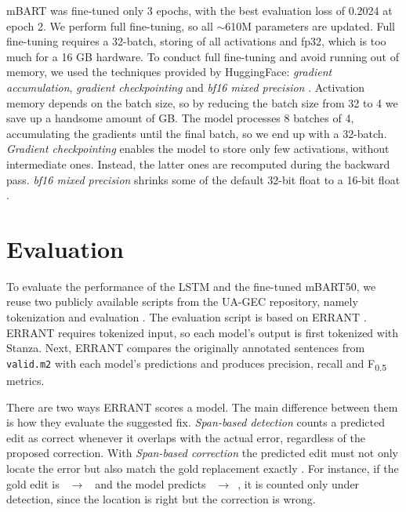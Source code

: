 \documentclass[11pt]{article}
\begin{document}
mBART was fine-tuned only 3 epochs, with the best evaluation loss of 0.2024 at epoch 2. We perform full fine-tuning, so all $\sim$610M parameters are updated. Full fine-tuning requires a 32-batch, storing of all activations and fp32, which is too much for a 16 GB hardware. To conduct full fine-tuning and avoid running out of memory, we used the techniques provided by HuggingFace:  \emph{gradient accumulation}, \emph{gradient checkpointing} and  \emph{bf16 mixed precision} \citep{huggingface-gpu-optimization}. Activation memory depends on the batch size, so by reducing the batch size from 32 to 4 we save up a handsome amount of GB. The model processes 8 batches of 4, accumulating the gradients until the final batch, so we end up with a 32-batch. 
 \emph{Gradient checkpointing} enables the model to store only few activations, without intermediate ones. Instead, the latter ones are recomputed during the backward pass. \emph{bf16 mixed precision} shrinks some of the default 32-bit float to a 16-bit float \citep{huggingface-gpu-optimization}.


 

\section{Evaluation}
To evaluate the performance of the LSTM and the fine-tuned mBART50, we reuse two publicly available scripts from the UA-GEC repository, namely tokenization and evaluation \citep{uagec-2023}. The evaluation script is based on ERRANT \citep{bryant-etal-2017-automatic}. ERRANT requires tokenized input, so each model's output is first tokenized with Stanza. Next, ERRANT compares the originally annotated sentences from \texttt{valid.m2} with each model's predictions and produces precision, recall and F\textsubscript{0.5} metrics.

There are two ways ERRANT scores a model. The main difference between them is how they evaluate the suggested fix. \textit{Span-based detection} counts a predicted edit as correct whenever it overlaps with the actual error, regardless of the proposed correction. With \textit{Span-based correction} the predicted edit must not only locate the error but also match the gold replacement exactly \citep{bryant-etal-2017-automatic}. For instance, if the gold edit is \texttt{ $\rightarrow$ } and the model predicts \texttt{ $\rightarrow$ }, it is counted only under detection, since the location is right but the correction is wrong. 
\end{document}
